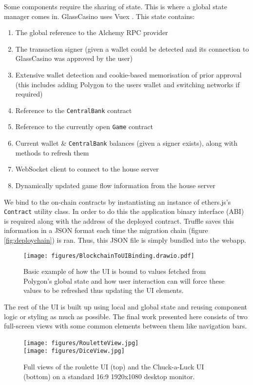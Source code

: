 \documentclass[10pt,journal,compsoc]{IEEEtran}
\begin{document}
Some components require the sharing of state. This is where a global state manager comes in. GlassCasino uses Vuex \cite{what_is_vuex_vuex}. This state contains:
\begin{enumerate}
    \item The global reference to the Alchemy RPC provider
    \item The transaction signer (given a wallet could be detected and its connection to GlassCasino was approved by the user)
    \item Extensive wallet detection and cookie-based memorisation of prior approval (this includes adding Polygon to the users wallet and switching networks if required)
    \item Reference to the \texttt{CentralBank} contract
    \item Reference to the currently open \texttt{Game} contract
    \item Current wallet \& \texttt{CentralBank} balances (given a signer exists), along with methods to refresh them
    \item WebSocket client to connect to the house server
    \item Dynamically updated game flow information from the house server
\end{enumerate}

We bind to the on-chain contracts by instantiating an instance of ethers.js's \texttt{Contract} utility class. In order to do this the application binary interface (ABI) is required along with the address of the deployed contract. Truffle saves this information in a JSON format each time the migration chain (figure \ref{fig:deploychain}) is ran. Thus, this JSON file is simply bundled into the webapp. 

\begin{figure}[!h]
    \centering
    \texttt{[image: figures/BlockchainToUIBinding.drawio.pdf]}
    \caption{Basic example of how the UI is bound to values fetched from Polygon's global state and how user interaction can will force these values to be refreshed thus updating the UI elements.}
    \label{fig:uibind}
\end{figure}

The rest of the UI is built up using local and global state and reusing component logic or styling as much as possible. The final work presented here consists of two full-screen views with some common elements between them like navigation bars.

\begin{figure}[!h]
    \centering
    \texttt{[image: figures/RouletteView.jpg]}
    \vspace{0.5cm} \ \\ 
    \texttt{[image: figures/DiceView.jpg]}
    \caption{Full views of the roulette UI (top) and the Chuck-a-Luck UI (bottom) on a standard 16:9 1920x1080 desktop monitor.}
    \label{fig:views}
\end{figure}
\end{document}
